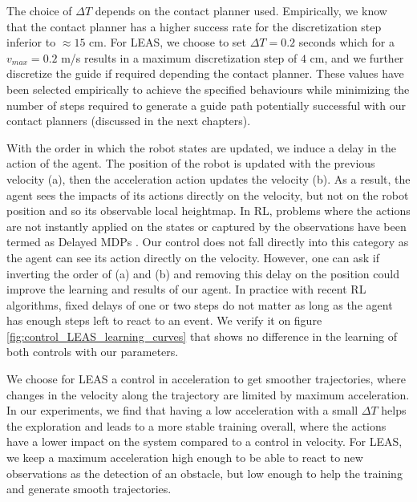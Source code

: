 The choice of $\Delta T$ depends on the contact planner used. 
Empirically, we know that the contact planner \cite{AcyclicCP} has a higher success rate for the discretization step inferior to $\approx 15$ cm.
For LEAS, we choose to set $\Delta T=0.2$ seconds which for a $v_{max}=0.2$ m/s results in a maximum discretization step of $4$ cm, and we further discretize the guide if required depending the contact planner.
These values have been selected empirically to achieve the specified behaviours while minimizing the number of steps required to generate a guide path potentially successful with our contact planners (discussed in the next chapters).

With the order in which the robot states are updated, we induce a delay in the action of the agent. 
The position of the robot is updated with the previous velocity (a), then the acceleration action updates the velocity (b). As a result, the agent sees the impacts of its actions directly on the velocity, but not on the robot position and so its observable local heightmap.
In RL, problems where the actions are not instantly applied on the states or captured by the observations have been termed as Delayed MDPs \cite{RL_delayed}. 
Our control does not fall directly into this category as the agent can see its action directly on the velocity. However, one can ask if inverting the order of (a) and (b) and removing this delay on the position could improve the learning and results of our agent. 
In practice with recent RL algorithms, fixed delays of one or two steps do not matter \cite{RL_delayed_explanation} as long as the agent has enough steps left to react to an event. We verify it on figure \ref{fig:control_LEAS_learning_curves} that shows no difference in the learning of both controls with our parameters.

We choose for LEAS a control in acceleration to get smoother trajectories, where changes in the velocity along the trajectory are limited by maximum acceleration.
In our experiments, we find that having a low acceleration with a small $\Delta T$ helps the exploration and leads to a more stable training overall, where the actions have a lower impact on the system compared to a control in velocity.
For LEAS, we keep a maximum acceleration high enough to be able to react to new observations as the detection of an obstacle, but low enough to help the training and generate smooth trajectories.

